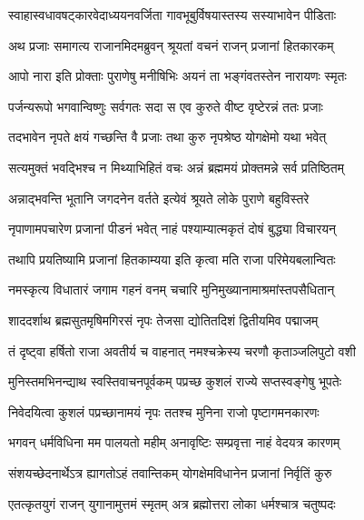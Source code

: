\twolineshloka
{स्वाहास्वधावषट्कारवेदाध्ययनवर्जिता}
{गावभूबुर्विषयास्तस्य सस्याभावेन पीडिताः} %

\twolineshloka
{अथ प्रजाः समागत्य राजानमिदमब्रुवन्}
{श्रूयतां वचनं राजन् प्रजानां हितकारकम्} %

\twolineshloka
{आपो नारा इति प्रोक्ताः पुराणेषु मनीषिभिः}
{अयनं ता भङ्गंवतस्तेन नारायणः स्मृतः} %

\twolineshloka
{पर्जन्यरूपो भगवान्विष्णुः सर्वगतः सदा}
{स एव कुरुते वीष्ट वृष्टेरन्नं ततः प्रजाः} %

\twolineshloka
{तदभावेन नृपते क्षयं गच्छन्ति वै प्रजाः}
{तथा कुरु नृपश्रेष्ठ योगक्षेमो यथा भवेत्} %


\twolineshloka
{सत्यमुक्तं भवद्भिश्च न मिथ्याभिहितं वचः}
{अन्नं ब्रह्ममयं प्रोक्तमन्ने सर्व प्रतिष्ठितम्} %

\twolineshloka
{अन्नाद्भवन्ति भूतानि जगदनेन वर्तते}
{इत्येवं श्रूयते लोके पुराणे बहुविस्तरे} %

\twolineshloka
{नृपाणामपचारेण प्रजानां पीडनं भवेत्}
{नाहं पश्याम्यात्मकृतं दोषं बुद्ध्या विचारयन्} %

\twolineshloka
{तथापि प्रयतिष्यामि प्रजानां हितकाम्यया}
{इति कृत्वा मति राजा परिमेयबलान्वितः} %

\twolineshloka
{नमस्कृत्य विधातारं जगाम गहनं वनम्}
{चचारि मुनिमुख्यानामाश्रमांस्तपसैधितान्} %

\twolineshloka
{शाददर्शाथ ब्रह्मसुतमृषिमगिरसं नृपः}
{तेजसा द्योतितदिशं द्वितीयमिव पद्माजम्} %

\twolineshloka
{तं दृष्ट्वा हर्षितो राजा अवतीर्य च वाहनात्}
{नमश्चक्रेस्य चरणौ कृताञ्जलिपुटो वशी} %

\twolineshloka
{मुनिस्तमभिनन्द्याथ स्वस्तिवाचनपूर्वकम्}
{पप्रच्छ कुशलं राज्ये सप्तस्वङ्गेषु भूपतेः} %

\twolineshloka
{निवेदयित्वा कुशलं पप्रच्छानामयं नृपः}
{ततश्च मुनिना राजो पृष्टागमनकारणः} %



\twolineshloka
{भगवन् धर्मविधिना मम पालयतो महीम्}
{अनावृष्टिः सम्प्रवृत्ता नाहं वेदयत्र कारणम्} %

\twolineshloka
{संशयच्छेदनार्थेऽत्र ह्यागतोऽहं तवान्तिकम्}
{योगक्षेमविधानेन प्रजानां निर्वृतिं कुरु} %


\twolineshloka
{एतत्कृतयुगं राजन् युगानामुत्तमं स्मृतम्}
{अत्र ब्रह्मोत्तरा लोका धर्मश्चात्र चतुष्पदः} %

